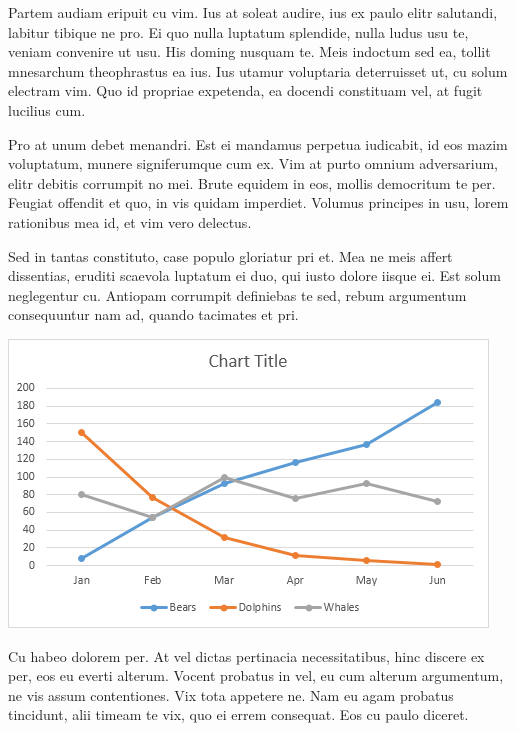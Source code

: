 \documentclass[12pt,a4paper]{report}
\begin{document}
    Partem audiam eripuit cu vim. Ius at soleat audire, ius ex paulo elitr salutandi, labitur tibique ne pro. Ei quo nulla luptatum splendide, nulla ludus usu te, veniam convenire ut usu. His doming nusquam te. Meis indoctum sed ea, tollit mnesarchum theophrastus ea ius. Ius utamur voluptaria deterruisset ut, cu solum electram vim. Quo id propriae expetenda, ea docendi constituam vel, at fugit lucilius cum.
    
    
    Pro at unum debet menandri. Est ei mandamus perpetua iudicabit, id eos mazim voluptatum, munere signiferumque cum ex. Vim at purto omnium adversarium, elitr debitis corrumpit no mei. Brute equidem in eos, mollis democritum te per. Feugiat offendit et quo, in vis quidam imperdiet. Volumus principes in usu, lorem rationibus mea id, et vim vero delectus.
    
    Sed in tantas constituto, case populo gloriatur pri et. Mea ne meis affert dissentias, eruditi scaevola luptatum ei duo, qui iusto dolore iisque ei. Est solum neglegentur cu. Antiopam corrumpit definiebas te sed, rebum argumentum consequuntur nam ad, quando tacimates et pri.
    
    \begin{center}\includegraphics[scale=0.8]{Chart1}\end{center}
    
    Cu habeo dolorem per. At vel dictas pertinacia necessitatibus, hinc discere ex per, eos eu everti alterum. Vocent probatus in vel, eu cum alterum argumentum, ne vis assum contentiones. Vix tota appetere ne. Nam eu agam probatus tincidunt, alii timeam te vix, quo ei errem consequat. Eos cu paulo diceret.
    
\end{document}
